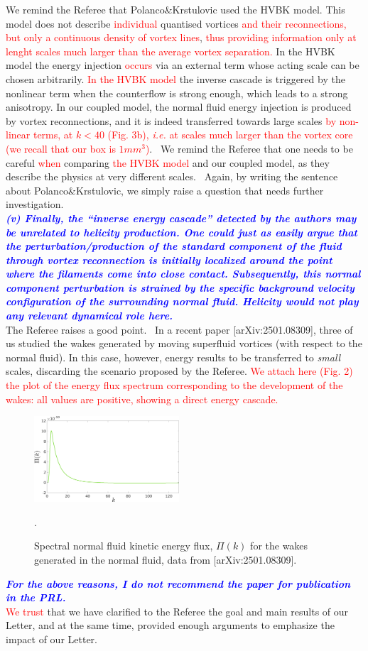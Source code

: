 \documentclass[a4paper,10pt]{article}
\def\red#1{\textcolor{red}{#1}}
\def\blue#1{\textcolor{blue}{#1}}
\def\refcomment#1{\textbf{\blue{\emph{#1}}}\\}
\begin{document}
We remind the Referee that Polanco\&Krstulovic used the HVBK model. 
This model does not describe \red{individual} quantised vortices 
\red{and their reconnections, but only a continuous density of vortex lines}, 
\red{thus providing information only at lenght scales 
much larger than the average vortex separation.} In the HVBK model
the energy injection
\red{occurs} via an external term whose acting scale can be chosen
arbitrarily. 
\red{In the HVBK model} the inverse cascade is triggered by the nonlinear 
term when the counterflow 
is strong enough, which leads to a strong anisotropy. 
In our coupled model, the normal fluid energy injection is produced 
by vortex reconnections, and it is indeed transferred towards large scales 
\red{by non-linear terms, at $k < 40$ (Fig. 3b), \textit{i.e.} at scales much larger than the vortex core (we recall that our box is
$1mm^3$)}. 
We remind the Referee that one needs to be careful \red{when}
comparing \red{the HVBK model} and our coupled model,
as they describe the physics at very different scales.  Again, by writing the sentence about Polanco\&Krstulovic, we simply raise a question that needs further investigation.\\

\refcomment{(v) Finally, the “inverse energy cascade” detected by the authors may be unrelated to helicity production. One could just as easily argue that the perturbation/production of the standard component of the fluid through vortex reconnection is initially localized around the point where the filaments come into close contact. Subsequently, this normal component perturbation is strained by the specific background velocity configuration of the surrounding normal fluid. Helicity would not play any relevant dynamical role here.}

The Referee raises a good point.  In a recent paper [arXiv:2501.08309], three of us studied the wakes generated by moving superfluid vortices (with respect to the normal fluid). In this case, however, energy results to be transferred to \textit{small} scales, discarding the scenario proposed by the Referee. \red{We attach here (Fig. 2) the plot of the energy flux spectrum corresponding to the development of the wakes: all values are positive, showing a direct energy cascade.} \\



%
\begin{figure}[h!]
    \centering
    \includegraphics*[width=0.48\textwidth]{flux_wakes.png}
    \caption{Spectral normal fluid kinetic energy flux, $\Pi (k)$ for the wakes generated in the normal fluid, data from [arXiv:2501.08309].}.
    
\end{figure}

\refcomment{For the above reasons, I do not recommend the paper for publication in the PRL.}

\noindent \red{We trust} that we have clarified to the Referee the goal and main results of our Letter, and at the same time, provided enough arguments to emphasize the impact of our Letter.
\end{document}
